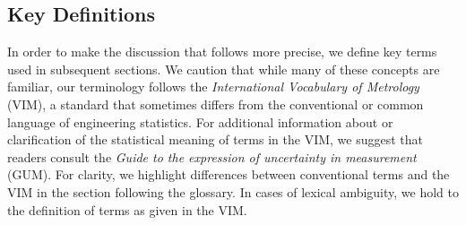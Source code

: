 \subsection{Key Definitions}

In order to make the discussion that follows more precise, we define key terms used in subsequent sections.
We caution that while many of these concepts are familiar, our terminology follows the {\it International Vocabulary of Metrology} (VIM)\citep{JCGM:VIM2012}, a standard that sometimes differs from the conventional or common language of engineering statistics. 
For additional information about or clarification of the statistical meaning of terms in the VIM, we suggest that readers consult the {\it Guide to the expression of uncertainty in measurement} (GUM)\citep{JCGM:GUM2008}.
For clarity, we highlight differences between conventional terms and the VIM in the section following the glossary.
In cases of lexical ambiguity, we hold to the definition of terms as given in the VIM.





